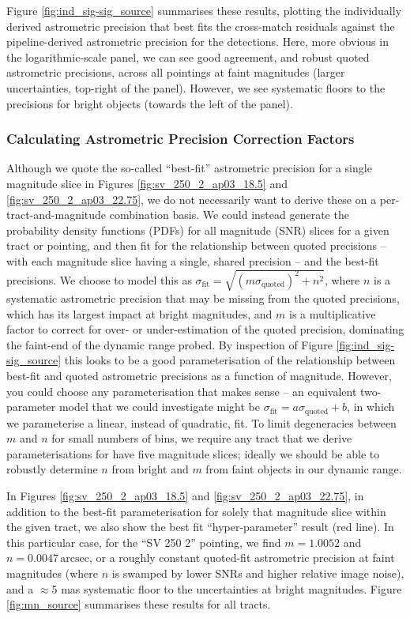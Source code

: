 \documentclass[SE,lsstdraft,authoryear,toc]{lsstdoc}
\begin{document}
Figure \ref{fig:ind_sig-sig_source} summarises these results, plotting the individually derived astrometric precision that best fits the cross-match residuals against the pipeline-derived astrometric precision for the detections.
Here, more obvious in the logarithmic-scale panel, we can see good agreement, and robust quoted astrometric precisions, across all pointings at faint magnitudes (larger uncertainties, top-right of the panel).
However, we see systematic floors to the precisions for bright objects (towards the left of the panel).

\subsubsection{Calculating Astrometric Precision Correction Factors}
Although we quote the so-called ``best-fit'' astrometric precision for a single magnitude slice in Figures \ref{fig:sv_250_2_ap03_18.5} and \ref{fig:sv_250_2_ap03_22.75}, we do not necessarily want to derive these on a per-tract-and-magnitude combination basis.
We could instead generate the probability density functions (PDFs) for all magnitude (SNR) slices for a given tract or pointing, and then fit for the relationship between quoted precisions -- with each magnitude slice having a single, shared precision -- and the best-fit precisions.
We choose to model this as $\sigma_\mathrm{fit} = \sqrt{(m \sigma_\mathrm{quoted})^2 + n^2}$, where $n$ is a systematic astrometric precision that may be missing from the quoted precisions, which has its largest impact at bright magnitudes, and $m$ is a multiplicative factor to correct for over- or under-estimation of the quoted precision, dominating the faint-end of the dynamic range probed.
By inspection of Figure \ref{fig:ind_sig-sig_source} this looks to be a good parameterisation of the relationship between best-fit and quoted astrometric precisions as a function of magnitude.
However, you could choose any parameterisation that makes sense -- an equivalent two-parameter model that we could investigate might be $\sigma_\mathrm{fit} = a \sigma_\mathrm{quoted} + b$, in which we parameterise a linear, instead of quadratic, fit.
To limit degeneracies between $m$ and $n$ for small numbers of bins, we require any tract that we derive parameterisations for have five magnitude slices; ideally we should be able to robustly determine $n$ from bright and $m$ from faint objects in our dynamic range.

In Figures \ref{fig:sv_250_2_ap03_18.5} and \ref{fig:sv_250_2_ap03_22.75}, in addition to the best-fit parameterisation for solely that magnitude slice within the given tract, we also show the best fit ``hyper-parameter'' result (red line).
In this particular case, for the ``SV 250 2'' pointing, we find $m = 1.0052$ and $n = 0.0047\,\mathrm{arcsec}$, or a roughly constant quoted-fit astrometric precision at faint magnitudes (where $n$ is swamped by lower SNRs and higher relative image noise), and a $\approx$5 mas systematic floor to the uncertainties at bright magnitudes.
Figure \ref{fig:mn_source} summarises these results for all tracts.
\end{document}
